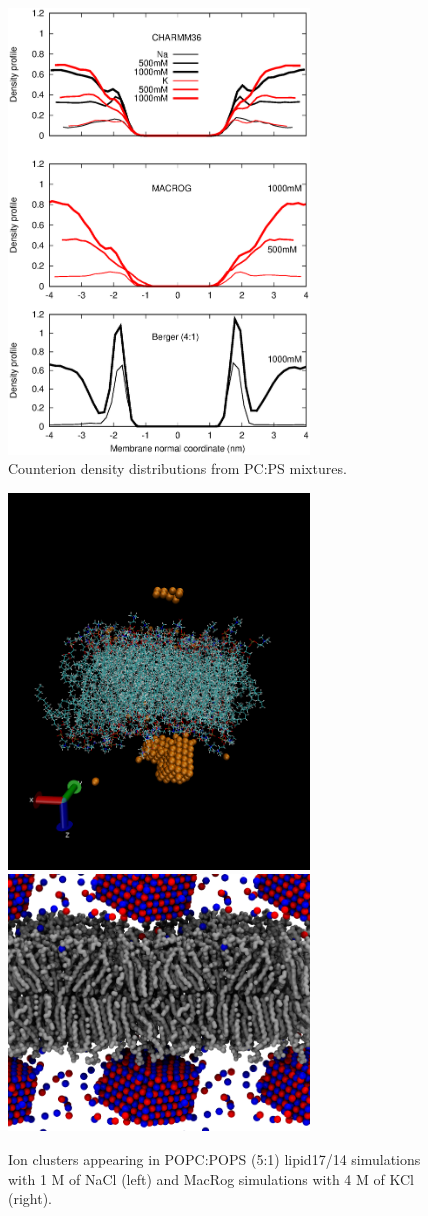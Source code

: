\documentclass[journal=jpcbfk]{achemso}
\begin{document}
\begin{figure}[]
  \centering
  \includegraphics[width=8.0cm]{../Figs/CIdensPSOCmixt.eps}
  \caption{  Counterion density distributions from PC:PS mixtures.
\label{CIdensPSOCmixt}
  }
\end{figure}
\begin{figure}[]
  \centering
  \includegraphics[width=8.0cm]{../Figs/lipid17cluster.png}
  \includegraphics[width=8.0cm]{../Figs/MacRogIONcluster.png}
  \caption{Ion clusters appearing in POPC:POPS (5:1) lipid17/14 simulations with 1 M of NaCl (left)
    and MacRog simulations with 4 M of KCl (right).
\label{ionCLUSTERS}
  }
\end{figure}
\end{document}
